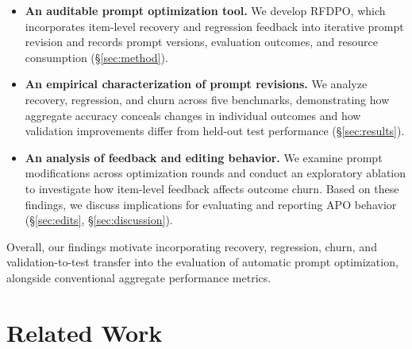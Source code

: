 \documentclass[11pt]{article}
\begin{document}
\begin{itemize}
\setlength{\itemsep}{2pt}
\setlength{\parskip}{0pt}
\setlength{\topsep}{2pt}

\item \textbf{An auditable prompt optimization tool.}
We develop RFDPO, which incorporates item-level recovery and regression feedback into iterative prompt revision and records prompt versions, evaluation outcomes, and resource consumption (\S\ref{sec:method}).

\item \textbf{An empirical characterization of prompt revisions.}
We analyze recovery, regression, and churn across five benchmarks, demonstrating how aggregate accuracy conceals changes in individual outcomes and how validation improvements differ from held-out test performance (\S\ref{sec:results}).

\item \textbf{An analysis of feedback and editing behavior.}
We examine prompt modifications across optimization rounds and conduct an exploratory ablation to investigate how item-level feedback affects outcome churn. Based on these findings, we discuss implications for evaluating and reporting APO behavior (\S\ref{sec:edits}, \S\ref{sec:discussion}).

\end{itemize}

Overall, our findings motivate incorporating recovery, regression, churn, and validation-to-test transfer into the evaluation of automatic prompt optimization, alongside conventional aggregate performance metrics.

\section{Related Work}
\label{sec:related}
\end{document}
